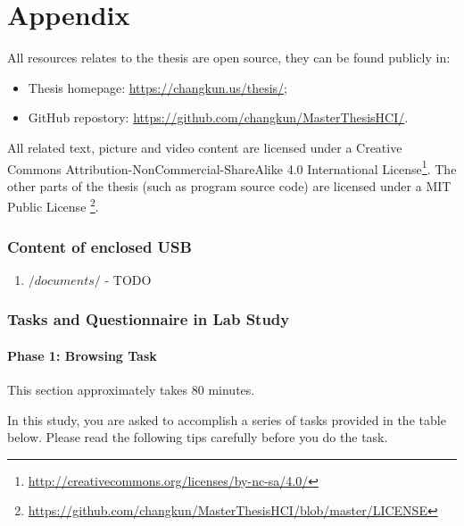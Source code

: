 \part*{Appendix}
\appendix
{}
\fancyhead[LE,RO,LO,RE]{} %

All resources relates to the thesis are open source, 
they can be found publicly in:

\begin{itemize}
    \item Thesis homepage: \url{https://changkun.us/thesis/};
    \item GitHub repostory: \url{https://github.com/changkun/MasterThesisHCI/}.
\end{itemize}

All related text, picture and video content are licensed under a 
Creative Commons Attribution-NonCommercial-ShareAlike 4.0 International 
License\footnote{\url{http://creativecommons.org/licenses/by-nc-sa/4.0/}}.
The other parts of the thesis (such as program source code) are licensed 
under a MIT Public License
\footnote{\url{https://github.com/changkun/MasterThesisHCI/blob/master/LICENSE}}.

\section{Content of enclosed USB}
\label{appendix:a}

\begin{enumerate}
    \item $/documents/$ - TODO
\end{enumerate}


\section{Tasks and Questionnaire in Lab Study}
\label{appendix:b}

\subsection{Phase 1: Browsing Task}

This section approximately takes 80 minutes.

In this study, you are asked to accomplish a series of tasks provided in the table below.
Please read the following tips carefully before you do the task.

